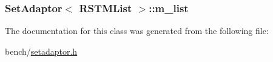 \hypertarget{classSetAdaptor_3_01RSTMList_01_4_a826afd01fb3a7f2166cf7e6789f99cbf}{
\subsubsection[{m\-\_\-list}]{ {\bf Set\-Adaptor}$<$ {\bf R\-S\-T\-M\-List} $>$\-::m\-\_\-list\hspace{0.3cm}{\ttfamily [private]}}}\label{classSetAdaptor_3_01RSTMList_01_4_a826afd01fb3a7f2166cf7e6789f99cbf}


The documentation for this class was generated from the following file\-:\begin{DoxyCompactItemize}
\item 
bench/\hyperlink{setadaptor_8h}{setadaptor.\-h}\end{DoxyCompactItemize}
